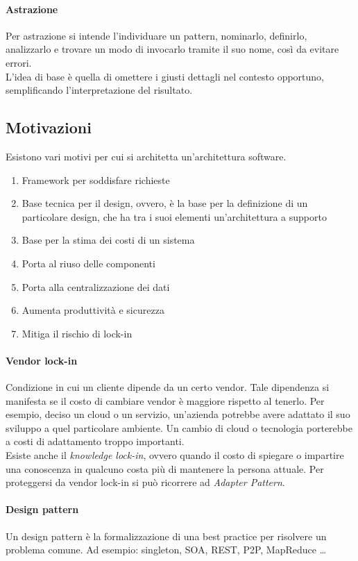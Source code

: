 \paragraph{Astrazione}
Per astrazione si intende l'individuare un pattern, nominarlo, definirlo, 
analizzarlo e trovare un modo di invocarlo tramite il suo nome, così da evitare
errori.\\
L'idea di base è quella di omettere i giusti dettagli nel contesto opportuno, 
semplificando l'interpretazione del risultato.

\subsection{Motivazioni}

Esistono vari motivi per cui si architetta un'architettura software.
\begin{enumerate}
    \item Framework per soddisfare richieste
    \item Base tecnica per il design, ovvero, è la base per la definizione di un
     particolare design, che ha tra i suoi elementi un'architettura a supporto
    \item Base per la stima dei costi di un sistema
    \item Porta al riuso delle componenti
    \item Porta alla centralizzazione dei dati
    \item Aumenta produttività e sicurezza
    \item Mitiga il rischio di lock-in
\end{enumerate}

\paragraph{Vendor lock-in}
Condizione in cui un cliente dipende da un certo vendor.
Tale dipendenza si manifesta se il costo di cambiare vendor è maggiore rispetto al 
tenerlo. Per esempio, deciso un cloud o un servizio, un'azienda potrebbe avere 
adattato il suo sviluppo a quel particolare ambiente. Un cambio di 
cloud o tecnologia porterebbe a costi di adattamento troppo importanti.\\
Esiste anche il \emph{knowledge lock-in}, ovvero quando il costo di spiegare o impartire 
una conoscenza in qualcuno costa più di mantenere la persona attuale.
Per proteggersi da vendor lock-in si può ricorrere ad \emph{Adapter Pattern}.

\paragraph{Design pattern}
Un design pattern è la formalizzazione di una best practice per risolvere un
problema comune.
Ad esempio: singleton, SOA, REST, P2P, MapReduce \dots


